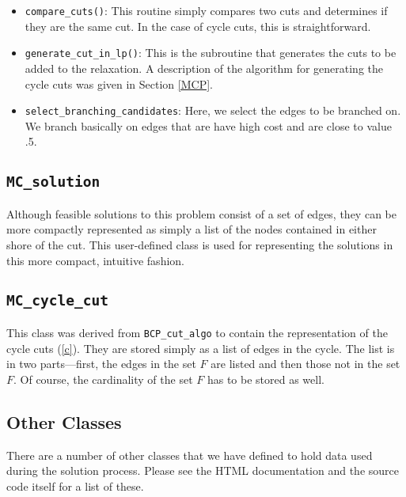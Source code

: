 \begin{itemize}
        \item {\tt compare\_cuts()}: This routine simply compares two
        cuts and determines if they are the same cut. In the case of
        cycle cuts, this is straightforward.

        \item {\tt generate\_cut\_in\_lp()}: This is the subroutine
        that generates the cuts to be added to the relaxation. A
        description of the algorithm for generating the cycle cuts was
        given in Section \ref{MCP}.

        \item {\tt select\_branching\_candidates}: Here, we select the
        edges to be branched on. We branch basically on edges that are
        have high cost and are close to value .5.

\end{itemize}

\subsection{\tt MC\_solution}
\label{MC-solution}

Although feasible solutions to this problem consist of a set of edges,
they can be more compactly represented as simply a list of the nodes
contained in either shore of the cut. This user-defined class is used
for representing the solutions in this more compact, intuitive
fashion.

\subsection{\tt MC\_cycle\_cut}

This class was derived from {\tt BCP\_cut\_algo} to contain the
representation of the cycle cuts (\ref{c}). They are stored simply as
a list of edges in the cycle. The list is in two parts---first, the
edges in the set $F$ are listed and then those not in the set $F$. Of
course, the cardinality of the set $F$ has to be stored as well.

\subsection{Other Classes}

There are a number of other classes that we have defined to hold
data used during the solution process. Please see the HTML
documentation and the source code itself for a list of these. 

